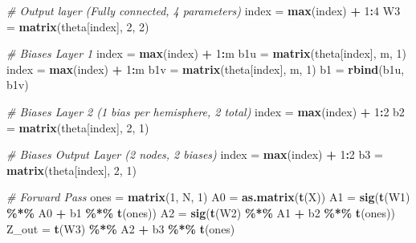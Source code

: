 \documentclass[12pt,halfline,a4paper,]{ouparticle}
\newenvironment{Shaded}{\begin{snugshade}}{\end{snugshade}}
\newcommand{\CommentTok}[1]{\textcolor[rgb]{0.56,0.35,0.01}{\textit{#1}}}
\newcommand{\DecValTok}[1]{\textcolor[rgb]{0.00,0.00,0.81}{#1}}
\newcommand{\FunctionTok}[1]{\textcolor[rgb]{0.13,0.29,0.53}{\textbf{#1}}}
\newcommand{\NormalTok}[1]{#1}
\newcommand{\OtherTok}[1]{\textcolor[rgb]{0.56,0.35,0.01}{#1}}
\newcommand{\SpecialCharTok}[1]{\textcolor[rgb]{0.81,0.36,0.00}{\textbf{#1}}}
\begin{document}
\begin{Shaded}
\begin{Highlighting}[]
  \CommentTok{\# Output layer (Fully connected, 4 parameters)}
\NormalTok{  index }\OtherTok{=} \FunctionTok{max}\NormalTok{(index) }\SpecialCharTok{+} \DecValTok{1}\SpecialCharTok{:}\DecValTok{4}
\NormalTok{  W3 }\OtherTok{=} \FunctionTok{matrix}\NormalTok{(theta[index], }\DecValTok{2}\NormalTok{, }\DecValTok{2}\NormalTok{)}
  
  \CommentTok{\# Biases Layer 1}
\NormalTok{  index }\OtherTok{=} \FunctionTok{max}\NormalTok{(index) }\SpecialCharTok{+} \DecValTok{1}\SpecialCharTok{:}\NormalTok{m}
\NormalTok{  b1u }\OtherTok{=} \FunctionTok{matrix}\NormalTok{(theta[index], m, }\DecValTok{1}\NormalTok{)}
\NormalTok{  index }\OtherTok{=} \FunctionTok{max}\NormalTok{(index) }\SpecialCharTok{+} \DecValTok{1}\SpecialCharTok{:}\NormalTok{m}
\NormalTok{  b1v }\OtherTok{=} \FunctionTok{matrix}\NormalTok{(theta[index], m, }\DecValTok{1}\NormalTok{)}
\NormalTok{  b1 }\OtherTok{=} \FunctionTok{rbind}\NormalTok{(b1u, b1v)}
  
  \CommentTok{\# Biases Layer 2 (1 bias per hemisphere, 2 total)}
\NormalTok{  index }\OtherTok{=} \FunctionTok{max}\NormalTok{(index) }\SpecialCharTok{+} \DecValTok{1}\SpecialCharTok{:}\DecValTok{2}
\NormalTok{  b2 }\OtherTok{=} \FunctionTok{matrix}\NormalTok{(theta[index], }\DecValTok{2}\NormalTok{, }\DecValTok{1}\NormalTok{)}
  
  \CommentTok{\# Biases Output Layer (2 nodes, 2 biases)}
\NormalTok{  index }\OtherTok{=} \FunctionTok{max}\NormalTok{(index) }\SpecialCharTok{+} \DecValTok{1}\SpecialCharTok{:}\DecValTok{2}
\NormalTok{  b3 }\OtherTok{=} \FunctionTok{matrix}\NormalTok{(theta[index], }\DecValTok{2}\NormalTok{, }\DecValTok{1}\NormalTok{)}
  
  \CommentTok{\# Forward Pass}
\NormalTok{  ones }\OtherTok{=} \FunctionTok{matrix}\NormalTok{(}\DecValTok{1}\NormalTok{, N, }\DecValTok{1}\NormalTok{)}
\NormalTok{  A0 }\OtherTok{=} \FunctionTok{as.matrix}\NormalTok{(}\FunctionTok{t}\NormalTok{(X))}
\NormalTok{  A1 }\OtherTok{=} \FunctionTok{sig}\NormalTok{(}\FunctionTok{t}\NormalTok{(W1) }\SpecialCharTok{\%*\%}\NormalTok{ A0 }\SpecialCharTok{+}\NormalTok{ b1 }\SpecialCharTok{\%*\%} \FunctionTok{t}\NormalTok{(ones))}
\NormalTok{  A2 }\OtherTok{=} \FunctionTok{sig}\NormalTok{(}\FunctionTok{t}\NormalTok{(W2) }\SpecialCharTok{\%*\%}\NormalTok{ A1 }\SpecialCharTok{+}\NormalTok{ b2 }\SpecialCharTok{\%*\%} \FunctionTok{t}\NormalTok{(ones))}
\NormalTok{  Z\_out }\OtherTok{=} \FunctionTok{t}\NormalTok{(W3) }\SpecialCharTok{\%*\%}\NormalTok{ A2 }\SpecialCharTok{+}\NormalTok{ b3 }\SpecialCharTok{\%*\%} \FunctionTok{t}\NormalTok{(ones)}
  

\end{Highlighting}
\end{Shaded}
\end{document}
